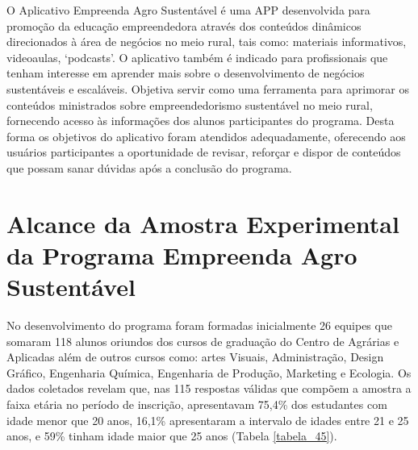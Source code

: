 O Aplicativo Empreenda Agro Sustentável é uma APP desenvolvida para promoção da educação empreendedora através dos conteúdos dinâmicos direcionados à área de negócios no meio rural, tais como: materiais informativos, videoaulas, ‘podcasts’. O aplicativo também é indicado para profissionais que tenham interesse em aprender mais sobre o desenvolvimento de negócios sustentáveis e escaláveis. Objetiva servir como uma ferramenta para aprimorar os conteúdos ministrados sobre empreendedorismo sustentável no meio rural, fornecendo acesso às informações dos alunos participantes do programa. Desta forma os objetivos do aplicativo foram atendidos adequadamente, oferecendo aos usuários participantes a oportunidade de revisar, reforçar e dispor de conteúdos que possam sanar dúvidas após a conclusão do programa.


\section{Alcance da Amostra Experimental da Programa Empreenda Agro Sustentável}

No desenvolvimento do programa foram formadas inicialmente 26 equipes que somaram 118 alunos oriundos dos cursos de graduação do Centro de Agrárias e Aplicadas além de outros cursos como: artes Visuais, Administração, Design Gráfico, Engenharia Química, Engenharia de Produção, Marketing e Ecologia.
Os dados coletados revelam que, nas 115 respostas válidas que compõem a amostra a faixa etária no período de inscrição, apresentavam 75,4\% dos estudantes com idade menor que 20 anos, 16,1\% apresentaram a intervalo de idades entre 21 e 25 anos, e 59\% tinham idade maior que 25 anos (Tabela \ref{tabela_45}).
 
